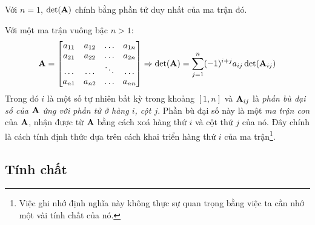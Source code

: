Với $n = 1$, $\det(\mathbf{A})$ chính bằng phần tử duy nhất của ma trận đó.

Với một ma trận vuông bậc $n>1$:
\begin{equation}
\mathbf{A} = \left[
\begin{matrix}
a_{11} & a_{12} & \dots & a_{1n} \\
a_{21} & a_{22} & \dots & a_{2n} \\
\dots & \dots & \ddots & \dots \\
a_{n1} & a_{n2} & \dots & a_{nn}
\end{matrix}
\right] \Rightarrow \det(\mathbf{A}) = \sum_{j=1}^n (-1)^{i+j} a_{ij}\det(\mathbf{A}_{ij})
\end{equation}
Trong đó $i$ là một số tự nhiên bất kỳ trong khoảng $[1, n]$ và $\mathbf{A}_{ij}$ là
\textit{phần bù đại số của $\mathbf{A}$ ứng với phần tử ở hàng $i$, cột $j$}. Phần bù
đại số này là một \textit{ma trận con} của $\mathbf{A}$, nhận được từ $\mathbf{A}$ bằng cách
xoá hàng thứ $i$ và cột thứ $j$ của nó. Đây chính là cách tính định thức dựa
trên cách khai triển hàng thứ $i$ của ma trận\footnote{Việc ghi nhớ định nghĩa
này không thực sự quan trọng bằng việc ta cần nhớ một vài tính chất của nó.}.


\subsection{Tính chất} %
\label{sub:tinh_chat}

